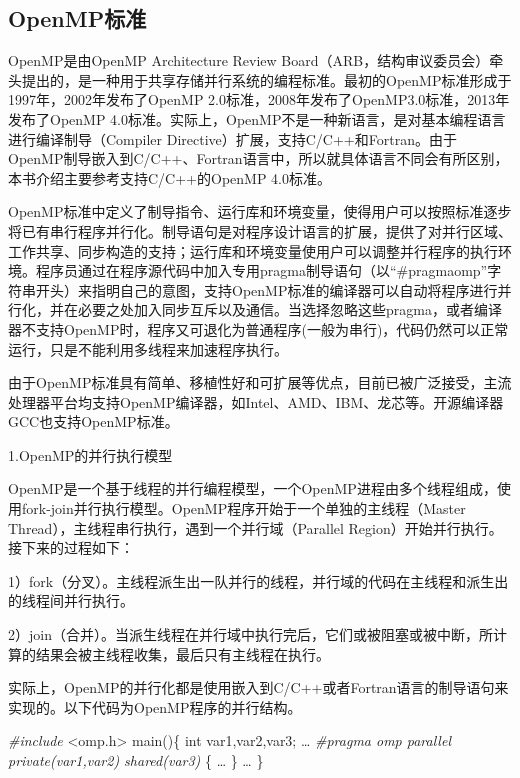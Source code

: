 \documentclass[]{ctexbook}
\newenvironment{Shaded}{\begin{snugshade}}{\end{snugshade}}
\newcommand{\DataTypeTok}[1]{\textcolor[rgb]{0.13,0.29,0.53}{#1}}
\newcommand{\ImportTok}[1]{#1}
\newcommand{\NormalTok}[1]{#1}
\newcommand{\PreprocessorTok}[1]{\textcolor[rgb]{0.56,0.35,0.01}{\textit{#1}}}
\begin{document}
\hypertarget{openmpux6807ux51c6}{%
\subsection{OpenMP标准}\label{openmpux6807ux51c6}}

OpenMP是由OpenMP Architecture Review Board（ARB，结构审议委员会）牵头提出的，是一种用于共享存储并行系统的编程标准。最初的OpenMP标准形成于1997年，2002年发布了OpenMP 2.0标准，2008年发布了OpenMP3.0标准，2013年发布了OpenMP 4.0标准。实际上，OpenMP不是一种新语言，是对基本编程语言进行编译制导（Compiler Directive）扩展，支持C/C++和Fortran。由于OpenMP制导嵌入到C/C++、Fortran语言中，所以就具体语言不同会有所区别，本书介绍主要参考支持C/C++的OpenMP 4.0标准。

OpenMP标准中定义了制导指令、运行库和环境变量，使得用户可以按照标准逐步将已有串行程序并行化。制导语句是对程序设计语言的扩展，提供了对并行区域、工作共享、同步构造的支持；运行库和环境变量使用户可以调整并行程序的执行环境。程序员通过在程序源代码中加入专用pragma制导语句（以``\#pragmaomp''字符串开头）来指明自己的意图，支持OpenMP标准的编译器可以自动将程序进行并行化，并在必要之处加入同步互斥以及通信。当选择忽略这些pragma，或者编译器不支持OpenMP时，程序又可退化为普通程序(一般为串行)，代码仍然可以正常运行，只是不能利用多线程来加速程序执行。

由于OpenMP标准具有简单、移植性好和可扩展等优点，目前已被广泛接受，主流处理器平台均支持OpenMP编译器，如Intel、AMD、IBM、龙芯等。开源编译器GCC也支持OpenMP标准。

1.OpenMP的并行执行模型

OpenMP是一个基于线程的并行编程模型，一个OpenMP进程由多个线程组成，使用fork-join并行执行模型。OpenMP程序开始于一个单独的主线程（Master Thread），主线程串行执行，遇到一个并行域（Parallel Region）开始并行执行。接下来的过程如下：

1）fork（分叉）。主线程派生出一队并行的线程，并行域的代码在主线程和派生出的线程间并行执行。

2）join（合并）。当派生线程在并行域中执行完后，它们或被阻塞或被中断，所计算的结果会被主线程收集，最后只有主线程在执行。

实际上，OpenMP的并行化都是使用嵌入到C/C++或者Fortran语言的制导语句来实现的。以下代码为OpenMP程序的并行结构。

\begin{Shaded}
\begin{Highlighting}[]
\PreprocessorTok{\#include }\ImportTok{\textless{}omp.h\textgreater{}}
\NormalTok{main()\{}
   \DataTypeTok{int}\NormalTok{ var1,var2,var3;}
\NormalTok{   …}
   \PreprocessorTok{\#pragma omp parallel private(var1,var2)  shared(var3)}
\NormalTok{   \{}
\NormalTok{      …}
\NormalTok{   \} }
\NormalTok{   …}
\NormalTok{\}}
\end{Highlighting}
\end{Shaded}
\end{document}
